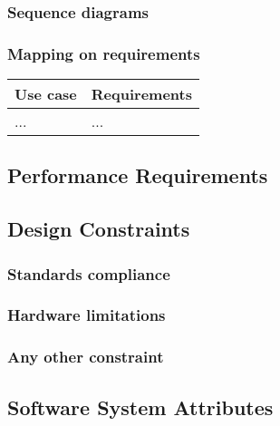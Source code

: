 \documentclass[11pt]{article}
\begin{document}
\subsubsection{Sequence diagrams}

\subsubsection{Mapping on requirements}

\begin{table}[H]
    \centering
    \setlength{\tabcolsep}{18pt}
    \renewcommand{\arraystretch}{1.2}
    \begin{tabularx}{\textwidth}{|>{\hsize=1.2\hsize}X|>{\hsize=0.8\hsize}X|}
        \hline
        \textbf{Use case} & \textbf{Requirements} \\
        \hline
        ... & ... \\
        \hline
    \end{tabularx}
    \label{tab:useCasesMapping}
\end{table}

\subsection{Performance Requirements}

\subsection{Design Constraints}

\subsubsection{Standards compliance}

\subsubsection{Hardware limitations}

\subsubsection{Any other constraint}

\subsection{Software System Attributes}
\end{document}
